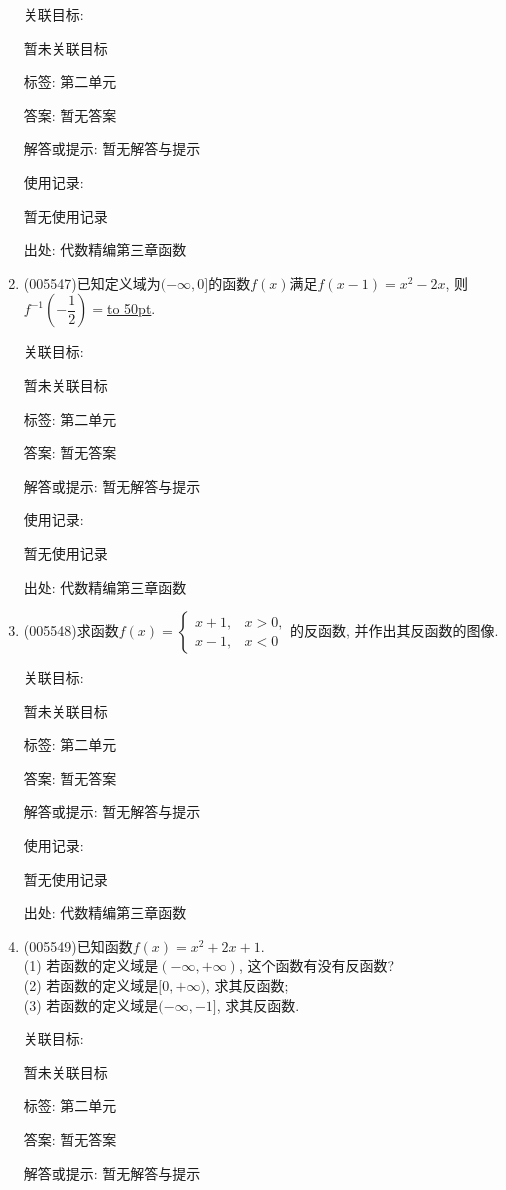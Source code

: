 \documentclass[10pt,a4paper]{article}
\newcommand{\blank}[1]{\underline{\hbox to #1pt{}}}
\begin{document}
\begin{enumerate}[1.]
关联目标:

暂未关联目标



标签: 第二单元

答案: 暂无答案

解答或提示: 暂无解答与提示

使用记录:

暂无使用记录


出处: 代数精编第三章函数
\item { (005547)}已知定义域为$(-\infty ,0]$的函数$f(x)$满足$f(x-1)=x^2-2x$, 则$f^{-1}(-\dfrac 12)=$\blank{50}.


关联目标:

暂未关联目标



标签: 第二单元

答案: 暂无答案

解答或提示: 暂无解答与提示

使用记录:

暂无使用记录


出处: 代数精编第三章函数
\item { (005548)}求函数$f(x)=\begin{cases}
   x+1, &  x>0,  \\ x-1, &  x<0  \end{cases}$的反函数, 并作出其反函数的图像.


关联目标:

暂未关联目标



标签: 第二单元

答案: 暂无答案

解答或提示: 暂无解答与提示

使用记录:

暂无使用记录


出处: 代数精编第三章函数
\item { (005549)}已知函数$f(x)=x^2+2x+1$.\\
(1) 若函数的定义域是$(-\infty ,+\infty)$, 这个函数有没有反函数?\\
(2) 若函数的定义域是$[0,+\infty)$, 求其反函数;\\
(3) 若函数的定义域是$(-\infty ,-1]$, 求其反函数.


关联目标:

暂未关联目标



标签: 第二单元

答案: 暂无答案

解答或提示: 暂无解答与提示


\end{enumerate}
\end{document}

